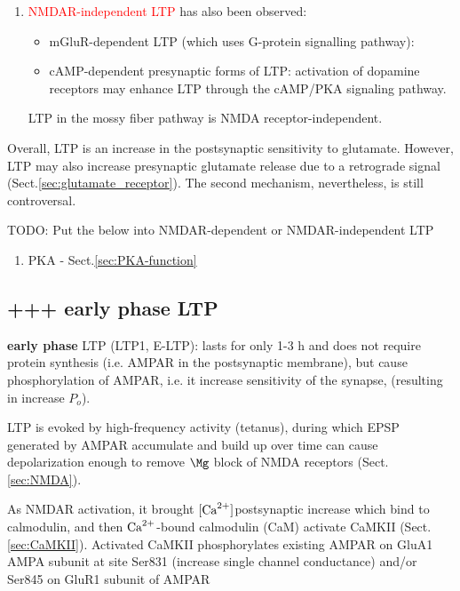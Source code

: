 \begin{enumerate}
\begin{enumerate}
   \item \textcolor{red}{NMDAR-independent LTP} has also been observed:

\begin{itemize}
  \item mGluR-dependent LTP (which uses G-protein signalling pathway):  
  
  \item cAMP-dependent presynaptic forms of LTP:
  activation of dopamine receptors may enhance LTP through the cAMP/PKA
  signaling pathway.  
 \end{itemize}
 LTP in  the mossy fiber pathway is NMDA receptor-independent.

 \end{enumerate}
Overall, LTP is an increase in the postsynaptic sensitivity to glutamate.
However, LTP may also increase presynaptic glutamate release due to a retrograde
signal (Sect.\ref{sec:glutamate_receptor}). The second mechanism, nevertheless,
is still controversal. 

\end{enumerate}

TODO: Put the below into NMDAR-dependent or NMDAR-independent LTP

\begin{enumerate}
  \item PKA - Sect.\ref{sec:PKA-function}
\end{enumerate}

\subsection{+++ early phase LTP}

{\bf early phase} LTP (LTP1, E-LTP): lasts for
  only 1-3 h and does not require protein synthesis (i.e. AMPAR in the postsynaptic membrane), but cause
  phosphorylation of AMPAR, i.e. it increase sensitivity of the synapse,
  (resulting in increase $P_o$).

LTP is evoked by high-frequency activity (tetanus), during which EPSP generated
by AMPAR accumulate and build up over time can cause depolarization enough to
remove $\Mg$ block of NMDA receptors (Sect.\ref{sec:NMDA}).

As NMDAR activation, it brought $[{\text{Ca}^{2+}}]$postsynaptic increase which bind to
calmodulin, and then ${\text{Ca}^{2+}}$-bound calmodulin (CaM) activate CaMKII
(Sect.\ref{sec:CaMKII}). Activated CaMKII phosphorylates existing AMPAR
on GluA1 AMPA subunit at site Ser831 (increase single channel conductance)
and/or Ser845 on GluR1 subunit of AMPAR \citep{kristensen2011}

